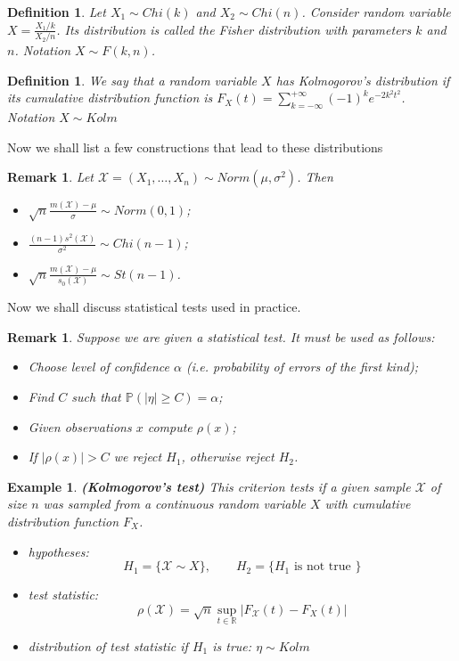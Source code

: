 \documentclass[12pt]{article}
\newtheorem{remark}[theorem]{Remark}
\newtheorem{definition}[theorem]{Definition}
\newtheorem{example}[theorem]{Example}
\begin{document}
\begin{definition} Let $X_1\sim Chi(k)$ and $X_2\sim Chi(n)$. Consider random variable $X=\frac{X_1/k}{X_2/n}$. Its distribution is called the Fisher distribution with parameters $k$ and $n$. Notation $X\sim F(k,n)$.
\end{definition}

\begin{definition} We say that a random variable $X$ has Kolmogorov's distribution if its cumulative distribution function is $F_X(t)=\sum_{k=-\infty}^{+\infty} (-1)^k e^{-2k^2t^2}$. Notation $X\sim Kolm$
\end{definition}

Now we shall list a few constructions that lead to these distributions

\begin{remark} Let $\mathscr{X}=(X_1,\ldots, X_n)\sim Norm(\mu,\sigma^2)$. Then
\begin{itemize}
    \item $\sqrt{n}\frac{m(\mathscr{X})-\mu}{\sigma}\sim Norm(0,1)$;
    \item $\frac{(n-1)s^2(\mathscr{X})}{\sigma^2}\sim Chi(n-1)$;
    \item $\sqrt{n}\frac{m(\mathscr{X})-\mu}{s_0(\mathscr{X})}\sim St(n-1)$.
\end{itemize}
\end{remark}

Now we shall discuss statistical tests used in practice.

\begin{remark}
Suppose we are given a statistical test. It must be used as follows:
\begin{itemize}
    \item Choose level of confidence $\alpha$ (i.e. probability of errors of the first kind);
    \item Find $C$ such that $\mathbb{P}(|\eta|\geq C)=\alpha$;
    \item Given observations $x$ compute $\rho(x)$;
    \item If $|\rho(x)|>C$ we reject $H_1$, otherwise reject $H_2$.
\end{itemize}
\end{remark}

\begin{example} \textbf{(Kolmogorov's test)} This criterion tests if a given sample $\mathscr{X}$ of size $n$ was sampled from a continuous random variable $X$ with cumulative distribution function $F_X$.
\begin{itemize}
    \item hypotheses: 
    $$H_1=\{\mathscr{X}\sim X\},\quad\quad H_2=\{H_1\mbox{ is not true }\}$$
    \item test statistic: 
    $$\rho(\mathscr{X})=\sqrt{n}\sup_{t\in\mathbb{R}}|F_{\mathscr{X}}(t)-F_X(t)|$$
    \item distribution of test statistic if $H_1$ is true: $\eta\sim Kolm$
\end{itemize}
\end{example}
\end{document}

